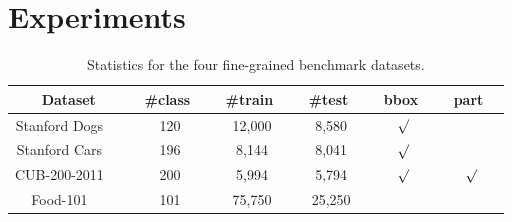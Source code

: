\documentclass[10pt,twocolumn,letterpaper]{article}
\begin{document}



\section{Experiments}

\begin{table}[t]
\begin{center}
\begin{tabular}{c|c|c|c|c|c}
\hline
Dataset & \ \#class \ & \ \#train \ & \ \#test \ & \ bbox \ & \ part \ \\\hline\hline
Stanford Dogs~\cite{bd4} \ & 120 & 12,000  &  8,580 & $\surd$ &    \\
Stanford Cars~\cite{bd5} \ & 196 & 8,144  & 8,041 & $\surd$ &  \\
CUB-200-2011~\cite{bd6} \ & 200 & 5,994 & 5,794 & $\surd$ & $\surd$ \\
Food-101~\cite{cvpr_ref1} \ & 101 & 75,750 & 25,250 & $ $ & $ $ \\\hline
\end{tabular}
\caption{Statistics for the four fine-grained benchmark datasets.}
\label{tab:statistics}
\end{center}
\end{table}
\end{document}
